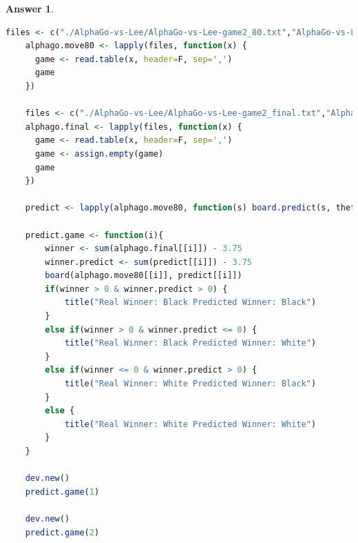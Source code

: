 \documentclass[12pt]{article}
\theoremstyle{colon}
\newtheorem*{answer}{Answer}
\begin{document}
\begin{answer}
\begin{lstlisting}[language=R, basicstyle=\scriptsize, breaklines=true]
    files <- c("./AlphaGo-vs-Lee/AlphaGo-vs-Lee-game2_80.txt","AlphaGo-vs-Lee/AlphaGo-vs-Lee-game4_80.txt")
    alphago.move80 <- lapply(files, function(x) {
      game <- read.table(x, header=F, sep=',')
      game
    })

    files <- c("./AlphaGo-vs-Lee/AlphaGo-vs-Lee-game2_final.txt","AlphaGo-vs-Lee/AlphaGo-vs-Lee-game4_final.txt")
    alphago.final <- lapply(files, function(x) {
      game <- read.table(x, header=F, sep=',')
      game <- assign.empty(game)
      game
    })

    predict <- lapply(alphago.move80, function(s) board.predict(s, theta.hat))

    predict.game <- function(i){
        winner <- sum(alphago.final[[i]]) - 3.75
        winner.predict <- sum(predict[[i]]) - 3.75
        board(alphago.move80[[i]], predict[[i]])
        if(winner > 0 & winner.predict > 0) {
            title("Real Winner: Black Predicted Winner: Black")
        }
        else if(winner > 0 & winner.predict <= 0) {
            title("Real Winner: Black Predicted Winner: White")
        }
        else if(winner <= 0 & winner.predict > 0) {
            title("Real Winner: White Predicted Winner: Black")
        }
        else {
            title("Real Winner: White Predicted Winner: White")
        }
    }

    dev.new()
    predict.game(1)

    dev.new()
    predict.game(2)
  \end{lstlisting}
\end{answer}

\clearpage
\end{document}
